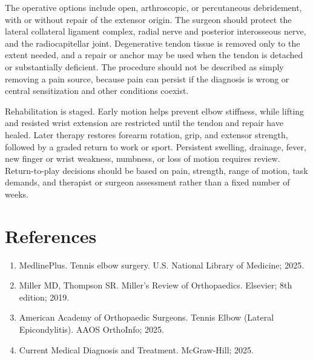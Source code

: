 The operative options include open, arthroscopic, or percutaneous debridement, with or without repair of the extensor origin. The surgeon should protect the lateral collateral ligament complex, radial nerve and posterior interosseous nerve, and the radiocapitellar joint. Degenerative tendon tissue is removed only to the extent needed, and a repair or anchor may be used when the tendon is detached or substantially deficient. The procedure should not be described as simply removing a pain source, because pain can persist if the diagnosis is wrong or central sensitization and other conditions coexist.

Rehabilitation is staged. Early motion helps prevent elbow stiffness, while lifting and resisted wrist extension are restricted until the tendon and repair have healed. Later therapy restores forearm rotation, grip, and extensor strength, followed by a graded return to work or sport. Persistent swelling, drainage, fever, new finger or wrist weakness, numbness, or loss of motion requires review. Return-to-play decisions should be based on pain, strength, range of motion, task demands, and therapist or surgeon assessment rather than a fixed number of weeks.

\section*{References}
\begin{enumerate}
  \item MedlinePlus. Tennis elbow surgery. U.S. National Library of Medicine; 2025.
  \item Miller MD, Thompson SR. Miller's Review of Orthopaedics. Elsevier; 8th edition; 2019.
  \item American Academy of Orthopaedic Surgeons. Tennis Elbow (Lateral Epicondylitis). AAOS OrthoInfo; 2025.
  \item Current Medical Diagnosis and Treatment. McGraw-Hill; 2025.
\end{enumerate}

\clearpage
